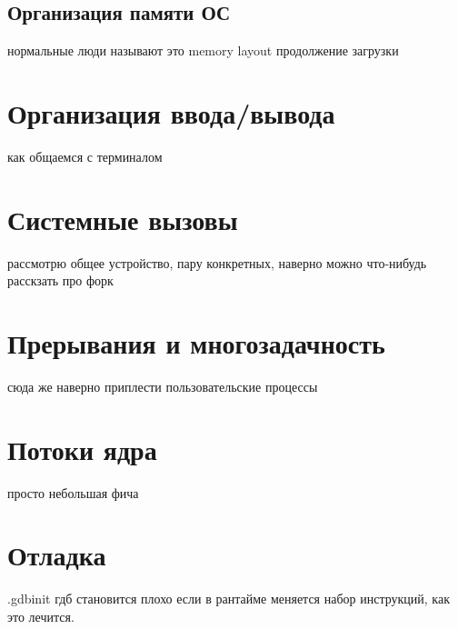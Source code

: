 \subsection{Организация памяти ОС}
нормальные люди называют это memory layout
продолжение загрузки

\section{Организация ввода/вывода}
как общаемся с терминалом

\section{Системные вызовы}
рассмотрю общее устройство, пару конкретных, наверно можно что-нибудь расскзать про форк

\section{Прерывания и многозадачность}
сюда же наверно приплести пользовательские процессы

\section{Потоки ядра}
просто небольшая фича

\section{Отладка}
.gdbinit
гдб становится плохо если в рантайме меняется набор инструкций, как это лечится.
